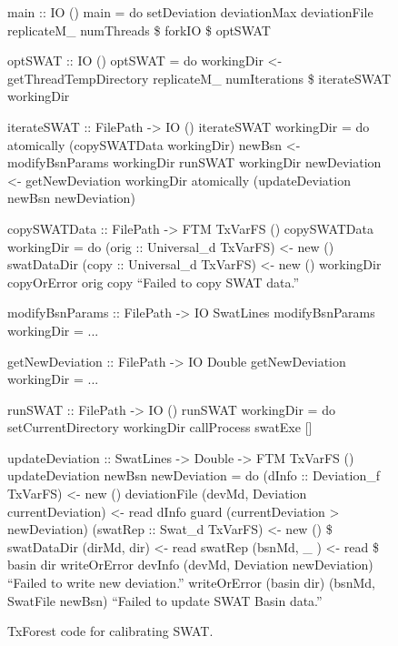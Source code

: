 \begin{figure}
\begin{code}
main :: IO ()
main = do
  setDeviation deviationMax deviationFile  
  replicateM_ numThreads \$ forkIO \$ optSWAT

\mbox{}
optSWAT :: IO ()
optSWAT = do
  workingDir <- getThreadTempDirectory
  replicateM_ numIterations \$ iterateSWAT workingDir

\mbox{}
iterateSWAT :: FilePath -> IO ()
iterateSWAT workingDir = do
  atomically (copySWATData workingDir)
  newBsn <- modifyBsnParams workingDir
  runSWAT workingDir
  newDeviation <- getNewDeviation workingDir
  atomically (updateDeviation newBsn newDeviation)

\mbox{}
copySWATData :: FilePath -> FTM TxVarFS ()
copySWATData workingDir = do
    (orig :: Universal_d TxVarFS) <- new () swatDataDir
    (copy :: Universal_d TxVarFS) <- new () workingDir
    copyOrError orig copy ``Failed to copy SWAT data.''

\mbox{}
modifyBsnParams :: FilePath -> IO SwatLines
modifyBsnParams workingDir = ...

\mbox{}
getNewDeviation :: FilePath -> IO Double
getNewDeviation workingDir = ...

\mbox{}
runSWAT :: FilePath -> IO ()
runSWAT workingDir = do
  setCurrentDirectory workingDir
  callProcess swatExe []

\mbox{}
updateDeviation :: SwatLines -> Double -> FTM TxVarFS ()
updateDeviation newBsn newDeviation =  do
  (dInfo :: Deviation_f TxVarFS) <- new () deviationFile
  (devMd, Deviation currentDeviation) <- read dInfo
  guard (currentDeviation > newDeviation)
  (swatRep :: Swat_d TxVarFS) <- new () \$ swatDataDir
  (dirMd, dir) <- read swatRep
  (bsnMd, _  ) <- read \$ basin dir
  writeOrError devInfo     (devMd, Deviation newDeviation) 
               ``Failed to write new deviation.''
  writeOrError (basin dir) (bsnMd, SwatFile  newBsn)       
               ``Failed to update SWAT Basin data.''


\end{code}
\caption{TxForest code for calibrating SWAT.}
\label{fig:SWAT-code}
\end{figure}



